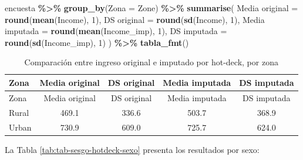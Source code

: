 \documentclass[
  spanish,
  12pt,
]{book}
\newenvironment{Shaded}{\begin{snugshade}}{\end{snugshade}}
\newcommand{\AttributeTok}[1]{\textcolor[rgb]{0.13,0.29,0.53}{#1}}
\newcommand{\DecValTok}[1]{\textcolor[rgb]{0.00,0.00,0.81}{#1}}
\newcommand{\FunctionTok}[1]{\textcolor[rgb]{0.13,0.29,0.53}{\textbf{#1}}}
\newcommand{\NormalTok}[1]{#1}
\newcommand{\OtherTok}[1]{\textcolor[rgb]{0.56,0.35,0.01}{#1}}
\newcommand{\SpecialCharTok}[1]{\textcolor[rgb]{0.81,0.36,0.00}{\textbf{#1}}}
\newcommand{\StringTok}[1]{\textcolor[rgb]{0.31,0.60,0.02}{#1}}
\begin{document}
\begin{Shaded}
\begin{Highlighting}[]
\NormalTok{encuesta }\SpecialCharTok{\%\textgreater{}\%}
  \FunctionTok{group\_by}\NormalTok{(}\AttributeTok{Zona =}\NormalTok{ Zone) }\SpecialCharTok{\%\textgreater{}\%}
  \FunctionTok{summarise}\NormalTok{(}
    \StringTok{\textasciigrave{}}\AttributeTok{Media original}\StringTok{\textasciigrave{}}  \OtherTok{=} \FunctionTok{round}\NormalTok{(}\FunctionTok{mean}\NormalTok{(Income), }\DecValTok{1}\NormalTok{),}
    \StringTok{\textasciigrave{}}\AttributeTok{DS original}\StringTok{\textasciigrave{}}     \OtherTok{=} \FunctionTok{round}\NormalTok{(}\FunctionTok{sd}\NormalTok{(Income), }\DecValTok{1}\NormalTok{),}
    \StringTok{\textasciigrave{}}\AttributeTok{Media imputada}\StringTok{\textasciigrave{}}  \OtherTok{=} \FunctionTok{round}\NormalTok{(}\FunctionTok{mean}\NormalTok{(Income\_imp), }\DecValTok{1}\NormalTok{),}
    \StringTok{\textasciigrave{}}\AttributeTok{DS imputada}\StringTok{\textasciigrave{}}     \OtherTok{=} \FunctionTok{round}\NormalTok{(}\FunctionTok{sd}\NormalTok{(Income\_imp), }\DecValTok{1}\NormalTok{)}
\NormalTok{  ) }\SpecialCharTok{\%\textgreater{}\%} \FunctionTok{tabla\_fmt}\NormalTok{()}
\end{Highlighting}
\end{Shaded}

\begin{longtable}[]{@{}lcccc@{}}
\caption{\label{tab:tab-sesgo-hotdeck-zona}Comparación entre ingreso original e imputado por hot-deck, por zona}\tabularnewline
\toprule\noalign{}
Zona & Media original & DS original & Media imputada & DS imputada \\
\midrule\noalign{}
\endfirsthead
\toprule\noalign{}
Zona & Media original & DS original & Media imputada & DS imputada \\
\midrule\noalign{}
\endhead
\bottomrule\noalign{}
\endlastfoot
Rural & 469.1 & 336.6 & 503.7 & 368.9 \\
Urban & 730.9 & 609.0 & 725.7 & 624.0 \\
\end{longtable}

La Tabla \ref{tab:tab-sesgo-hotdeck-sexo} presenta los resultados por sexo:
\end{document}
